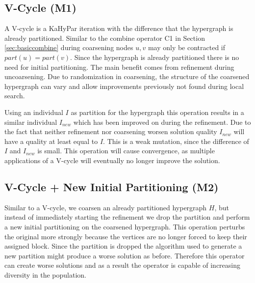 \documentclass[a4paper,12pt,titlepage, BCOR7mm,headsepline]{scrbook}
\numberwithin{equation}{section}
\begin{document}
\subsection{V-Cycle (M1)}
\label{sec:vcycles}
A V-cycle is a KaHyPar iteration with the difference that the hypergraph is already partitioned. Similar to the combine operator C1 in Section \ref{sec:basiccombine} during coarsening nodes $u,v$ may only be contracted if $part(u) = part(v)$. Since the hypergraph is already partitioned there is no need for initial partitioning. The main benefit comes from refinement during uncoarsening. Due to randomization in coarsening, the structure of the coarsened hypergraph can vary and allow improvements previously not found during local search.

Using an individual $I$ as partition for the hypergraph this operation results in a similar individual $I_{new}$ which has been improved on during the refinement. Due to the fact that neither refinement nor coarsening worsen solution quality $I_{new}$ will have a quality at least equal to $I$. This is a weak mutation, since the difference of $I$ and $I_{new}$ is small. This operation will cause convergence, as multiple applications of a V-cycle will eventually no longer improve the solution.
\subsection{V-Cycle + New Initial Partitioning (M2)}
Similar to a V-cycle, we coarsen an already partitioned hypergraph $H$, but instead of immediately starting the refinement we drop the partition and perform a new initial partitioning on the coarsened hypergraph. This operation perturbs the original more strongly because the vertices are no longer forced to keep their assigned block. Since the partition is
dropped the algorithm used to generate a new partition might produce a worse solution as before. Therefore this operator can create worse solutions and as a result the operator is capable of increasing diversity in the population. 
\end{document}
